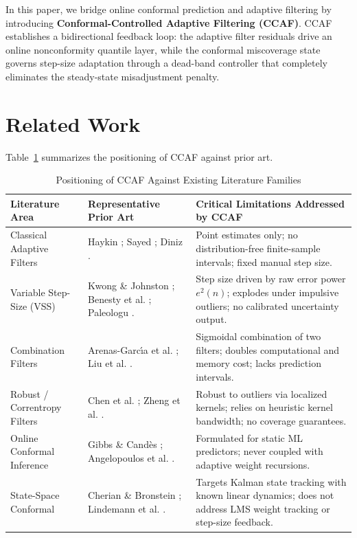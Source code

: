 \documentclass[journal,twocolumn]{IEEEtran}
\begin{document}
In this paper, we bridge online conformal prediction and adaptive filtering by introducing \textbf{Conformal-Controlled Adaptive Filtering (CCAF)}. CCAF establishes a bidirectional feedback loop: the adaptive filter residuals drive an online nonconformity quantile layer, while the conformal miscoverage state governs step-size adaptation through a dead-band controller that completely eliminates the steady-state misadjustment penalty.

\section{Related Work}
Table~\ref{tab:landscape} summarizes the positioning of CCAF against prior art.

\begin{table}[t]
\centering
\caption{Positioning of CCAF Against Existing Literature Families}
\label{tab:landscape}
\begin{tabular}{lp{6.2cm}p{6.8cm}}
\toprule
\textbf{Literature Area} & \textbf{Representative Prior Art} & \textbf{Critical Limitations Addressed by CCAF} \\
\midrule
Classical Adaptive Filters & Haykin \cite{haykin2013adaptive}; Sayed \cite{sayed2008adaptive}; Diniz \cite{diniz2020adaptive}. & Point estimates only; no distribution-free finite-sample intervals; fixed manual step size. \\
Variable Step-Size (VSS) & Kwong \& Johnston \cite{kwong1992variable}; Benesty et al. \cite{benesty2006nonparametric}; Paleologu \cite{paleologu2008robust}. & Step size driven by raw error power $e^2(n)$; explodes under impulsive outliers; no calibrated uncertainty output. \\
Combination Filters & Arenas-Garc{\'\i}a et al. \cite{arenas2006new}; Liu et al. \cite{liu2024convex}. & Sigmoidal combination of two filters; doubles computational and memory cost; lacks prediction intervals. \\
Robust / Correntropy Filters & Chen et al. \cite{chen2017generalized, chen2020maximum}; Zheng et al. \cite{zheng2021generalized}. & Robust to outliers via localized kernels; relies on heuristic kernel bandwidth; no coverage guarantees. \\
Online Conformal Inference & Gibbs \& Cand{\`e}s \cite{gibbs2021adaptive, gibbs2024conformal}; Angelopoulos et al. \cite{angelopoulos2023conformal}. & Formulated for static ML predictors; never coupled with adaptive weight recursions. \\
State-Space Conformal & Cherian \& Bronstein \cite{cherian2024conformalized}; Lindemann et al. \cite{lindemann2023safe}. & Targets Kalman state tracking with known linear dynamics; does not address LMS weight tracking or step-size feedback. \\
\bottomrule
\end{tabular}
\end{table}
\end{document}
